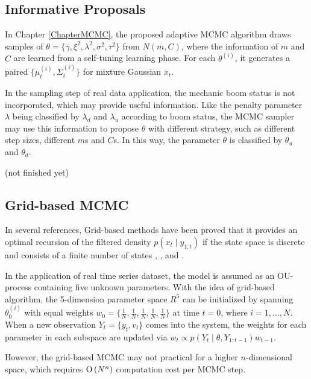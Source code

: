 \subsection*{Informative Proposals}

In Chapter \ref{ChapterMCMC}, the proposed adaptive MCMC algorithm draws samples of $\theta=\{\gamma,\xi^2,\lambda^2,\sigma^2,\tau^2\}$ from $N(m,C)$, where the information of $m$ and $C$ are learned from a self-tuning learning phase. For each $\theta^{(i)}$, it generates a paired $\{\mu_t^{(i)},\Sigma_t^{(i)}\}$ for mixture Gaussian $x_t$. 

In the sampling step of real data application, the mechanic boom status is not incorporated, which may provide useful information. Like the penalty parameter $\lambda$ being classified by $\lambda_d$ and $\lambda_u$ according to boom status, the MCMC sampler may use this information to propose $\theta$ with different strategy, such as different step sizes, different $m$s and $C$s. In this way, the parameter $\theta$ is classified by $\theta_u$ and $\theta_d$. 

(not finished yet)




\subsection*{Grid-based MCMC}

In several references, Grid-based methods have been proved that it provides an optimal recursion of the filtered density $p(x_t\mid y_{1:t})$ if the state space is discrete and consists of a finite number of states \cite{ristic2004beyond}, \cite{stroud2016bayesian}, \cite{arulampalam2002tutorial} and \cite{hartmann2016grid}. 

In the application of real time series dataset, the model is assumed as an OU-process containing five unknown parameters. With the idea of grid-based algorithm, the 5-dimension parameter space $\mathit{R}^5$ can be initialized by spanning $\theta_0^{(i)}$ with equal weights $w_0=\{\frac{1}{N},\frac{1}{N},\frac{1}{N},\frac{1}{N},\frac{1}{N}\}$ at time $t=0$, where $i=1,\ldots,N$. When a new observation $Y_t=\{y_t,v_t\}$ comes into the system, the weights for each parameter in each subspace are updated via $w_t\propto p(Y_t\mid \theta,Y_{1:t-1})w_{t-1}$. 

However, the grid-based MCMC may not practical for a higher $n$-dimensional space, which requires ${\rm O}\left(N^n\right)$ computation cost per MCMC step. 























